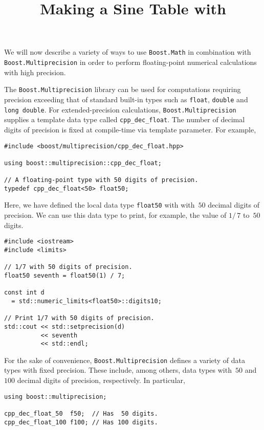 \documentclass{article}[10pt]
\def\codedefault {\ttfamily}
\begin{document}
\title{Making a Sine Table with {\codedefault{Boost.Multiprecision}}}
\maketitle

\noindent
We will now describe a variety of ways to use
\lstinline|Boost.Math| in combination with
\lstinline|Boost.Multiprecision|
in order to perform floating-point numerical calculations
with high precision.

The \lstinline|Boost.Multiprecision| library can be used
for computations requiring precision exceeding that
of standard built-in types such as
\lstinline|float|, \lstinline|double| and \lstinline|long double|.
For extended-precision calculations,
\lstinline|Boost.Multiprecision| supplies a template data
type called \lstinline|cpp_dec_float|.
The number of decimal digits of precision is fixed at compile-time
via template parameter. For example,

\begin{lstlisting}
#include <boost/multiprecision/cpp_dec_float.hpp>

using boost::multiprecision::cpp_dec_float;

// A floating-point type with 50 digits of precision.
typedef cpp_dec_float<50> float50;
\end{lstlisting}

Here, we have defined the local data type
\lstinline|float50| with with~$50$ decimal digits of
precision. We can use this data type to print, for example,
the value of $1/\,7$ to~$50$ digits.

\begin{lstlisting}
#include <iostream>
#include <limits>

// 1/7 with 50 digits of precision.
float50 seventh = float50(1) / 7;

const int d
  = std::numeric_limits<float50>::digits10;

// Print 1/7 with 50 digits of precision.
std::cout << std::setprecision(d)
          << seventh
          << std::endl;
\end{lstlisting}

For the sake of convenience, \lstinline|Boost.Multiprecision|
defines a variety of data types with fixed precision.
These include, among others, data types with~$50$ and~$100$
decimal digits of precision, respectively. In particular,

\begin{lstlisting}
using boost::multiprecision;

cpp_dec_float_50  f50;  // Has  50 digits.
cpp_dec_float_100 f100; // Has 100 digits.
\end{lstlisting}
\end{document}
